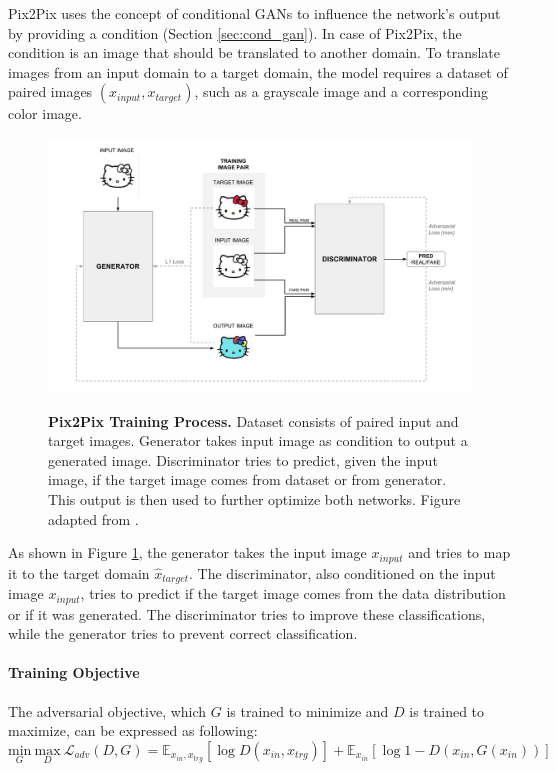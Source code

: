 \documentclass[12pt]{report}
\begin{document}
Pix2Pix uses the concept of conditional GANs \cite{mirza_conditional_2014} to influence the network's output by providing a condition (Section \ref{sec:cond_gan}). In case of Pix2Pix, the condition is an image that should be translated to another domain. To translate images from an input domain to a target domain, the model requires a dataset of paired images $(x_{input}, x_{target})$, such as a grayscale image and a corresponding color image. 


\begin{figure}[h]
\centering
{\includegraphics[width=\linewidth]{03_analysis/gans/pix2pix}}
\caption{\label{fig:pix2pix} \textbf{Pix2Pix Training Process.} Dataset consists of paired input and target images. Generator takes input image as condition to output a generated image. Discriminator tries to predict, given the input image, if the target image comes from dataset or from generator. This output is then used to further optimize both networks. Figure adapted from \cite{hesse_image--image_2017}.}
\end{figure}

As shown in Figure \ref{fig:pix2pix}, the generator takes the input image $x_{input}$ and tries to map it to the target domain $\hat{x}_{target}$. The discriminator, also conditioned on the input image $x_{input}$, tries to predict if the target image comes from the data distribution or if it was generated. The discriminator tries to improve these classifications, while the generator tries to prevent correct classification.


\paragraph{Training Objective}
The adversarial objective, which $G$ is trained to minimize and $D$ is trained to maximize, can be expressed as following:
\begin{equation}
\underset{G}{\mathrm{min}} \ \underset{D}{\mathrm{max}} \ \mathcal{L}_{adv}(D,G) = \mathbb{E}_{x_{in},x_{trg}}[\log D(x_{in},x_{trg})] + \mathbb{E}_{x_{in}}[\log 1 - D(x_{in}, G(x_{in}))]
\label{eq:pix2pix_minimax_cond}
\end{equation}
\end{document}
